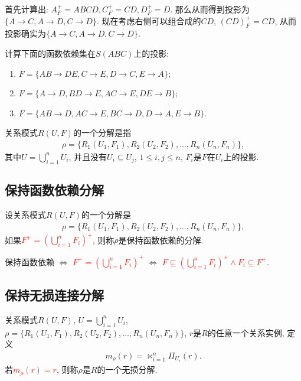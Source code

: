 首先计算出: $A_F^+=ABCD, C_F^+=CD,D_F^+=D$. 那么从而得到投影为$\{A\to C,A\to D,C\to D\}$.
现在考虑右侧可以组合成的$CD$, $(CD)_F^+=CD$, 从而投影确实为$\{A\to C,A\to D,C\to D\}$.

\begin{example}
  计算下面的函数依赖集在$S(ABC)$上的投影:
  \begin{enumerate}
      \item $F=\{AB\to DE, C\to E, D\to C, E\to A\}$;
      \item $F=\{A\to D,BD\to E, AC\to E, DE\to B\}$;
      \item $F=\{AB\to D, AC\to E,BC\to D,D\to A,E\to B\}$.
  \end{enumerate}
\end{example}


\begin{definition}[模式分解]
  关系模式$R(U,F)$的一个分解是指
  \begin{align*}
    \rho = \{R_1(U_1,F_1), R_2(U_2,F_2),\dots,R_n(U_n,F_n)\},
  \end{align*}
  其中$U=\bigcup_{i=1}^n U_i$, 并且没有$U_i\subseteq U_j$, $1\leq i,j\leq n$, $F_i$是$F$在$U_i$上的投影.
\end{definition}

\subsection{保持函数依赖分解}

\begin{definition}[保持函数依赖分解]
  设关系模式$R(U,F)$的一个分解是
  \begin{align*}
    \rho = \{R_1(U_1,F_1), R_2(U_2,F_2),\dots,R_n(U_n,F_n)\},
  \end{align*}
  如果\textcolor{red}{$F^+=\left(\bigcup_{i=1}^n F_i\right)^+$},
  则称$\rho$是保持函数依赖的分解.
\end{definition}

保持函数依赖 $\Leftrightarrow$ \textcolor{red}{$F^+=\left(\bigcup_{i=1}^n F_i\right)^+$}
$\Leftrightarrow$ \textcolor{red}{$F\subseteq \left(\bigcup_{i=1}^n F_i\right)^+ \land F_i \subseteq F^+$}.


\subsection{保持无损连接分解}

\begin{definition}[无损连接分解]
  关系模式$R(U,F)$, $U=\bigcup_{i=1}^n U_i$, $\rho = \{R_1(U_1,F_1), R_2(U_2,F_2),\dots,R_n(U_n,F_n)\}$, $r$是$R$的任意一个关系实例, 定义
  \begin{align*}
    m_{\rho}(r) = \bowtie_{i=1}^n \Pi_{U_i}(r).
  \end{align*}
  若\textcolor{red}{$m_{\rho}(r)=r$}, 则称$\rho$是$R$的一个无损分解.
\end{definition}

